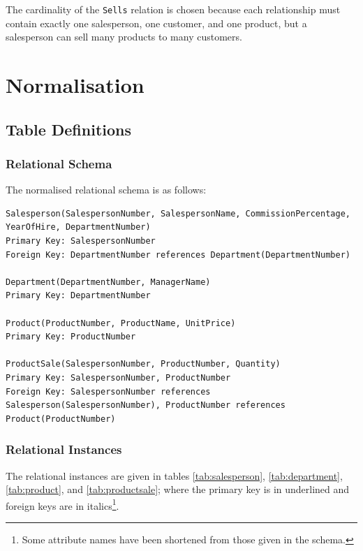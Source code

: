 \documentclass{article}
\begin{document}
The cardinality of the \texttt{Sells} relation is chosen because each relationship must contain exactly one salesperson, one customer, and one product, but a salesperson can sell many products to many customers.

\section{Normalisation}
\subsection{Table Definitions}
\subsubsection{Relational Schema}
The normalised relational schema is as follows:
\begin{lstlisting}
Salesperson(SalespersonNumber, SalespersonName, CommissionPercentage, YearOfHire, DepartmentNumber)
Primary Key: SalespersonNumber
Foreign Key: DepartmentNumber references Department(DepartmentNumber)

Department(DepartmentNumber, ManagerName)
Primary Key: DepartmentNumber

Product(ProductNumber, ProductName, UnitPrice)
Primary Key: ProductNumber

ProductSale(SalespersonNumber, ProductNumber, Quantity)
Primary Key: SalespersonNumber, ProductNumber
Foreign Key: SalespersonNumber references Salesperson(SalespersonNumber), ProductNumber references Product(ProductNumber)
\end{lstlisting}
\subsubsection{Relational Instances}
The relational instances are given in tables \ref{tab:salesperson}, \ref{tab:department}, \ref{tab:product}, and \ref{tab:productsale}; where the primary key is in underlined and foreign keys are in italics\footnote{Some attribute names have been shortened from those given in the schema.}.
\end{document}
